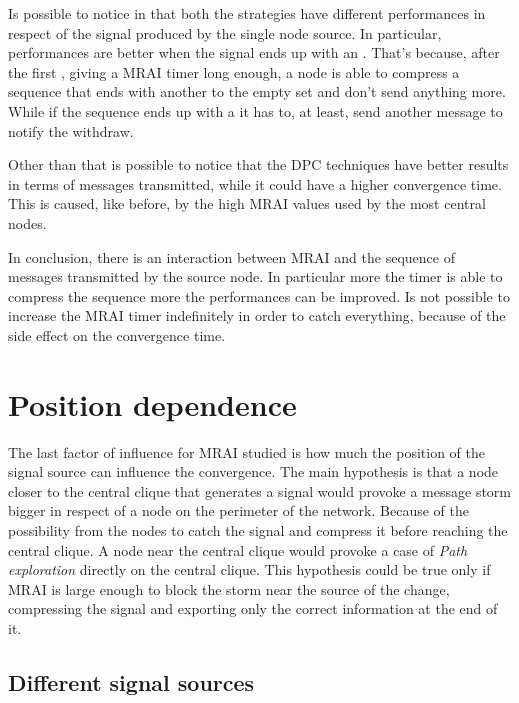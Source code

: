 Is possible to notice in  that
both the strategies have different performances in respect of the signal
produced by the single node source.
In particular, performances are better when the signal ends up with an .
That's because, after the first , giving a \ac{MRAI} timer long enough,
a node is able to compress a sequence that ends with another  to the
empty set and don't send anything more.
While if the sequence ends up with a  it has to, at least, send another
message to notify the withdraw.

Other than that is possible to notice that the \ac{DPC} techniques have better
results in terms of messages transmitted, while it could have a higher
convergence time.
This is caused, like before, by the high \ac{MRAI} values used by the most
central nodes.

In conclusion, there is an interaction between \ac{MRAI} and the sequence of messages
transmitted by the source node.
In particular more the timer is able to compress the sequence more the performances
can be improved.
Is not possible to increase the \ac{MRAI} timer indefinitely in order to catch
everything, because of the side effect on the convergence time.

\section{Position dependence}
\label{sec:position_dependance}

The last factor of influence for \ac{MRAI} studied is how much
the position of the signal source can influence the convergence.
The main hypothesis is that a node closer to the central clique that generates
a signal would provoke a message storm bigger in respect of a node on the perimeter
of the network.
Because of the possibility from the nodes to catch the signal and compress it
before reaching the central clique.
A node near the central clique would provoke a case of \textit{Path exploration}
directly on the central clique.
This hypothesis could be true only if \ac{MRAI} is large enough to block the
storm near the source of the change, compressing the signal and exporting only
the correct information at the end of it.

\subsection{Different signal sources}
\label{subsec:different_destinations}

